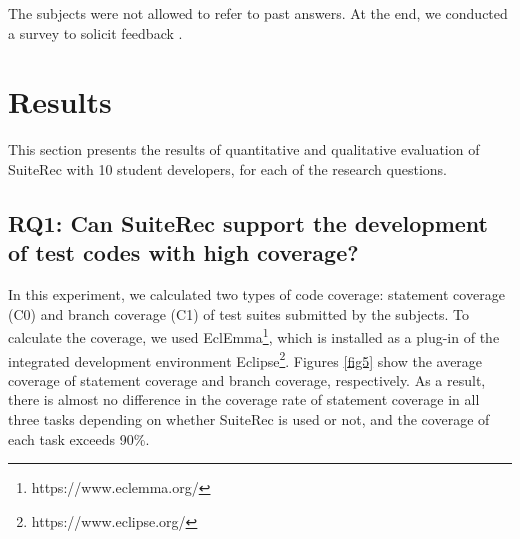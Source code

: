 \documentclass[conference]{IEEEtran}
\begin{document}
The subjects were not allowed to refer to past answers. At the end, we conducted a survey to solicit feedback .





\section{Results}
This section presents the results of quantitative and qualitative evaluation  of SuiteRec with 10 student developers, for each of the research questions.

\subsection{RQ1: Can SuiteRec support the development of test codes with high coverage?}
In this experiment, we calculated two types of code coverage: statement coverage (C0) and branch coverage (C1) of test suites submitted by the subjects. To calculate the coverage, we used EclEmma\footnote{https://www.eclemma.org/}, which is installed as a plug-in of the integrated development environment Eclipse\footnote{https://www.eclipse.org/}. Figures \ref{fig5} show the average coverage of statement coverage and branch coverage, respectively. As a result, there is almost no difference in the coverage rate of statement coverage in all three tasks depending on whether SuiteRec is used or not, and the coverage of each task exceeds 90\%.
\end{document}
